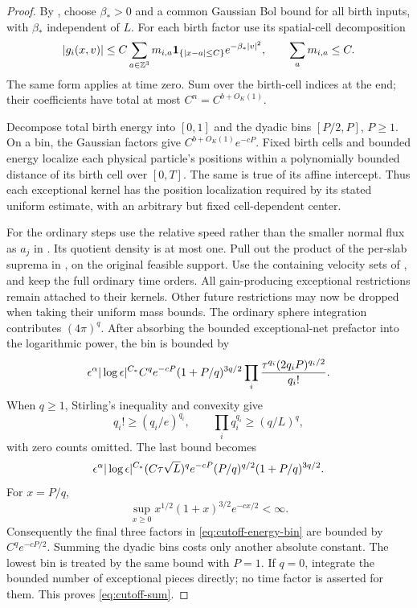 \begin{proof}
By , choose
\(\beta_*>0\) and a common Gaussian Bol bound for all birth
inputs, with \(\beta_*\) independent of \(L\).  For each
birth factor use its spatial-cell decomposition
\[
 |g_i(x,v)|\leq C\sum_{a\in\mathbb Z^3}m_{i,a}
       \mathbf 1_{\{|x-a|\leq C\}}e^{-\beta_*|v|^2},
 \qquad \sum_a m_{i,a}\leq C .
\]
The same form applies at time zero.  Sum over the birth-cell
indices at the end; their coefficients have total at most
\(C^n=C^{b+O_K(1)}\).

Decompose total birth energy into \([0,1]\) and the dyadic
bins \([P/2,P]\), \(P\geq1\).  On a bin, the Gaussian factors
give \(C^{b+O_K(1)}e^{-cP}\).  Fixed birth cells and bounded
energy localize each physical particle's positions within
a polynomially bounded distance of its birth cell over
\([0,T]\).  The same is true of its affine intercept.
Thus each exceptional kernel has the position localization
required by its stated uniform estimate, with an arbitrary
but fixed cell-dependent center.

For the ordinary steps use the relative speed rather than
the smaller normal flux as \(a_j\) in
.  Its quotient density is at
most one.  Pull out the product of the per-slab suprema
in , on the original feasible support.
Use the containing velocity sets of
, and keep the full ordinary
time orders.  All gain-producing exceptional restrictions
remain attached to their kernels.  Other future restrictions
may now be dropped when taking their uniform mass bounds.
The ordinary sphere integration contributes \((4\pi)^q\).
After absorbing the bounded exceptional-net prefactor into
the logarithmic power, the bin is bounded by
\[
 \epsilon^\alpha|\log\epsilon|^{C_*}
 C^q e^{-cP}(1+P/q)^{3q/2}
 \prod_i\frac{\tau^{q_i}(2q_iP)^{q_i/2}}{q_i!}.
\]
When \(q\geq1\), Stirling's inequality and convexity give
\[
 q_i!\geq(q_i/e)^{q_i},\qquad
 \prod_iq_i^{q_i}\geq(q/L)^q ,
\]
with zero counts omitted.  The last bound becomes
\begin{equation}\label{eq:cutoff-energy-bin}
 \epsilon^\alpha|\log\epsilon|^{C_*}
 (C\tau\sqrt L)^q e^{-cP}
 (P/q)^{q/2}(1+P/q)^{3q/2}.
\end{equation}
For \(x=P/q\),
\[
 \sup_{x\geq0}x^{1/2}(1+x)^{3/2}e^{-cx/2}<\infty .
\]
Consequently the final three factors in
\eqref{eq:cutoff-energy-bin} are bounded by
\(C^qe^{-cP/2}\).  Summing the dyadic bins costs only
another absolute constant.  The lowest bin is treated
by the same bound with \(P=1\).
If \(q=0\), integrate the bounded number of exceptional
pieces directly; no time factor is asserted for them.
This proves \eqref{eq:cutoff-sum}.
\end{proof}

